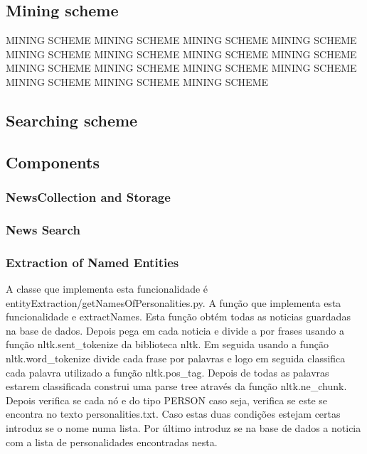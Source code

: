 \documentclass{acm_proc_article-sp}
\begin{document}
\subsection{Mining scheme}
MINING SCHEME MINING SCHEME MINING SCHEME MINING SCHEME MINING SCHEME MINING SCHEME MINING SCHEME MINING SCHEME MINING SCHEME MINING SCHEME MINING SCHEME MINING SCHEME MINING SCHEME MINING SCHEME MINING SCHEME 

\subsection{Searching scheme}


\subsection{Components}

\subsubsection{NewsCollection and Storage}

\subsubsection{News Search}

\subsubsection{Extraction of Named Entities}
A classe que implementa esta funcionalidade é entityExtraction/getNamesOfPersonalities.py. 
A função que implementa esta funcionalidade e extractNames. 
Esta função obtém todas as noticias guardadas na base de dados. 
Depois pega em cada noticia e divide a por frases usando a função nltk.sent_tokenize da biblioteca nltk. 
Em seguida usando a função nltk.word_tokenize divide cada frase por palavras e logo em seguida classifica cada palavra utilizado a função nltk.pos_tag. 
Depois de todas as palavras estarem classificada construi  uma parse tree através da função nltk.ne_chunk.
Depois verifica se cada nó e do tipo PERSON caso seja, verifica se este se encontra no texto personalities.txt. 
Caso estas duas condições estejam certas introduz se o nome numa lista. 
Por último introduz se na base de dados a noticia com a lista de personalidades encontradas nesta.
\end{document}
